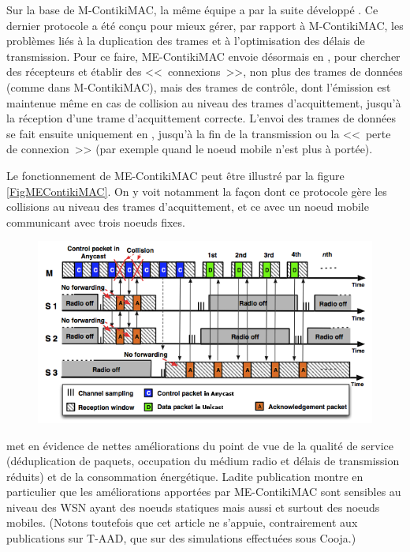 \medskip

Sur la base de M-ContikiMAC, la même équipe a par la suite développé
. Ce dernier protocole a été conçu pour mieux
gérer, par rapport à M-ContikiMAC, les problèmes liés à la duplication
des trames et à l'optimisation des délais de transmission. Pour ce faire,
ME-ContikiMAC envoie désormais en , pour chercher
des récepteurs et établir des <<~connexions~>>, non plus des trames
de données (comme dans M-ContikiMAC), mais des trames de contrôle, dont
l'émission est maintenue même en cas de collision au niveau des trames
d'acquittement, jusqu'à la réception d'une trame d'acquittement correcte.
L'envoi des trames de données se fait ensuite uniquement en
, jusqu'à la fin de la transmission ou la <<~perte
de connexion~>> (par exemple quand le noeud mobile n'est plus à portée).

Le fonctionnement de ME-ContikiMAC peut être illustré par la figure
\vref{FigMEContikiMAC}. On y voit notamment la façon dont ce protocole
gère les collisions au niveau des trames d'acquittement, et ce avec
un noeud mobile communicant avec trois noeuds fixes.

\begin{figure}[!hbt]
\centering
\includegraphics[width=12.75cm]{images/ch3-me-contikimac.png}
\label{FigMEContikiMAC}
\end{figure}

\cite{ME-ContikiMAC} met en évidence de nettes améliorations
du point de vue de la qualité de service (déduplication de paquets,
occupation du médium radio et délais de transmission réduits) et
de la consommation énergétique. Ladite publication montre en
particulier que les améliorations apportées par ME-ContikiMAC sont
sensibles au niveau des WSN ayant des noeuds statiques mais aussi
et surtout des noeuds mobiles. (Notons toutefois que cet article
ne s'appuie, contrairement aux publications sur T-AAD, que sur
des simulations effectuées sous Cooja.)

